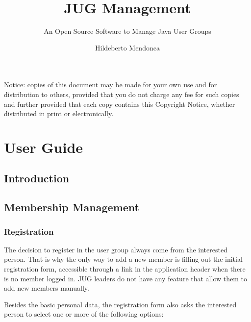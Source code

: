 \documentclass[envcountsame,envcountchap]{svmono}
\author{Hildeberto Mendonca}
\title{JUG Management}
\subtitle{An Open Source Software to Manage Java User Groups}
\begin{document}
\maketitle

\frontmatter

\thispagestyle{empty}
\vspace*{3.5cm}
\begin{flushleft}
Notice: copies of this document may be made for your own use and for distribution to others, provided that you do not charge any fee for such copies and further provided that each copy contains this Copyright Notice, whether distributed in print or electronically.
\end{flushleft}

\tableofcontents

\mainmatter

\part{User Guide}

\chapter{Introduction}

\chapter{Membership Management}

\section{Registration}

The decision to register in the user group always come from the interested person. That is why the only way to add a new member is filling out the initial registration form, accessible through a link in the application header when there is no member logged in. JUG leaders do not have any feature that allow them to add new members manually.

Besides the basic personal data, the registration form also asks the interested person to select one or more of the following options:
\end{document}

